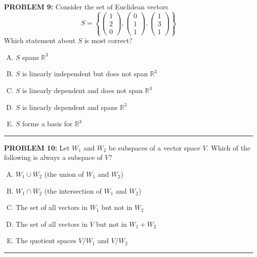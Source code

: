\documentclass[12pt]{amsart}
\newcommand{\divider}{
  \vspace{-1em} %
  \noindent
  \raisebox{-0.15ex}{\textbullet}%
  \hspace{0.5em}%
  \rule[0.5ex]{0.95\textwidth}{1.0pt}%
  \hspace{0.5em}%
  \raisebox{-0.15ex}{\textbullet}%
  \vspace{0em} %
}
\begin{document}
{\bf PROBLEM 9:}
Consider the set of Euclidean vectors 
\[
    S = \left\{
    \begin{pmatrix}1\\2\\0\end{pmatrix}, 
    \begin{pmatrix}0\\1\\1\end{pmatrix}, 
    \begin{pmatrix}1\\3\\1\end{pmatrix}
    \right\}
\]
Which statement about $S$ is most correct?

\begin{enumerate}[(A)]
\item $S$ spans $\mathbb{R}^3$
\item $S$ is linearly independent but does not span $\mathbb{R}^3$
\item $S$ is linearly dependent and does not span $\mathbb{R}^3$
\item $S$ is linearly dependent and spans $\mathbb{R}^3$
\item $S$ forms a basis for $\mathbb{R}^3$
\end{enumerate}
\divider


{\bf PROBLEM 10:}
Let $W_1$ and $W_2$ be subspaces of a vector space $V$. Which of the following is always a subspace of $V$?

\begin{enumerate}[(A)]
\item $W_1 \cup W_2$ (the union of $W_1$ and $W_2$)
\item $W_1 \cap W_2$ (the intersection of $W_1$ and $W_2$)
\item The set of all vectors in $W_1$ but not in $W_2$
\item The set of all vectors in $V$ but not in $W_1+W_2$
\item The quotient spaces $V/W_1$ and $V/W_2$
\end{enumerate}
\divider
\end{document}
